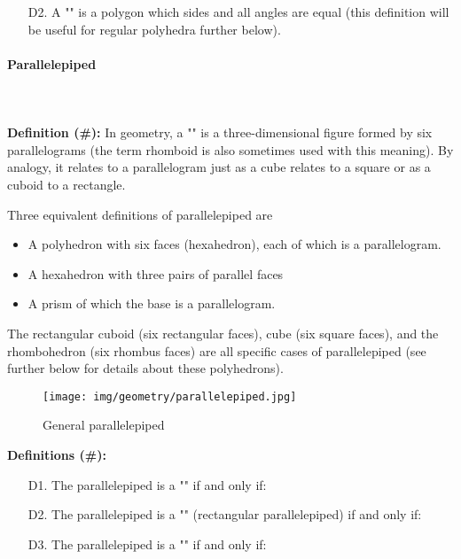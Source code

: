 {\begin{enumerate}
		\item[D2.] A "" is a polygon which sides and all angles are equal (this definition will be useful for regular polyhedra further below).
	\end{enumerate}
	
	\paragraph{Parallelepiped}\mbox{}\\\\
	\textbf{Definition (\#\mydef):} In geometry, a "" is a three-dimensional figure formed by six parallelograms (the term rhomboid is also sometimes used with this meaning). By analogy, it relates to a parallelogram just as a cube relates to a square or as a cuboid to a rectangle.
	
	Three equivalent definitions of parallelepiped are
	\begin{itemize}
		\item A polyhedron with six faces (hexahedron), each of which is a parallelogram.
	
		\item A hexahedron with three pairs of parallel faces
		
		\item A prism of which the base is a parallelogram.
	\end{itemize}
	The rectangular cuboid (six rectangular faces), cube (six square faces), and the rhombohedron (six rhombus faces) are all specific cases of parallelepiped (see further below for details about these polyhedrons).
	
	\begin{figure}[H]
		\centering
		\texttt{[image: img/geometry/parallelepiped.jpg]}
		\caption{General parallelepiped}
	\end{figure}
	\textbf{Definitions (\#\mydef):}
	\begin{itemize}
		\item[D1.] The parallelepiped is a "" if and only if:
		
		\item[D2.] The parallelepiped is a "" (rectangular parallelepiped) if and only if:
		
		\item[D3.] The parallelepiped is a ""  if and only if:
		

\end{itemize}}

